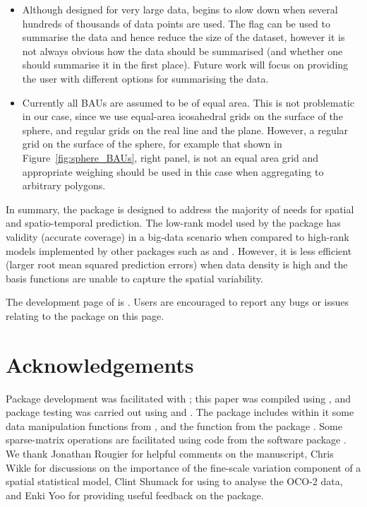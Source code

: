 \begin{itemize}
\item Although designed for very large data,  begins to slow down when several hundreds of thousands of data points are used. The flag  can be used to summarise the data and hence reduce the size of the dataset, however it is not always obvious how the data should be summarised (and whether one should summarise it in the first place). Future work will focus on providing the user with different options for summarising the data.

\item Currently all BAUs are assumed to be of equal area. This is not problematic in our case, since we use equal-area icosahedral grids on the surface of the sphere, and regular grids on the real line and the plane. However, a regular grid on the surface of the sphere, for example that shown in Figure~\ref{fig:sphere_BAUs}, right panel, is not an equal area grid and appropriate weighing should be used in this case when aggregating to arbitrary polygons.

\end{itemize}

In summary, the package  is designed to address the majority of needs for spatial and spatio-temporal prediction.  The low-rank model used by the package has validity (accurate coverage) in a big-data scenario when compared to high-rank models implemented by other packages such as  and . However, it is less efficient (larger root mean squared prediction errors) when data density is high and the basis functions are unable to capture the spatial variability.

The development page of  is . Users are encouraged to report any bugs or issues relating to the package on this page.

\section*{Acknowledgements}

Package development was facilitated with ; this paper was compiled using , and package testing was carried out using  and . The package includes within it some data manipulation functions from , and the function  from the package . Some sparse-matrix operations are facilitated using  code from the software package  \citep{SuiteSparse}. We thank Jonathan Rougier for helpful comments on the manuscript, Chris Wikle for discussions on the importance of the fine-scale variation component of a spatial statistical model, Clint Shumack for using  to analyse the OCO-2 data, and Enki Yoo for providing useful feedback on the package.

